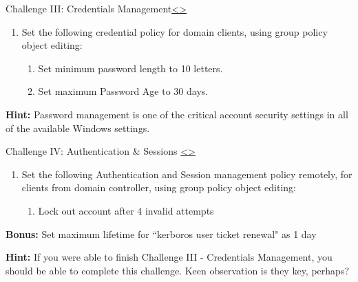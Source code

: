 \documentclass[12pt]{extarticle}
\newenvironment{instructionblock}{\Large\bgroup}{\egroup}
\begin{document}
\pagebreak
\begin{slide}{Challenge III: Credentials Management}{\hyperref[slide 20]{\textless}\hyperref[slide 22]{\textgreater}}
\begin{instructionblock}
\begin{enumerate}
	\item Set the following credential policy for domain clients, using group policy object editing:
\begin{enumerate}
 \item Set minimum password length to 10 letters.
 \item Set maximum Password Age to 30 days.
 \end{enumerate}
 \end{enumerate}

\end{instructionblock}
\end{slide}
\vspace{2mm}
\noindent
\textbf{Hint:} Password management is one of the critical account security settings in all of the available Windows settings.

\vfill




\pagebreak
\begin{slide}{Challenge IV: Authentication \& Sessions }{\hyperref[slide 21]{\textless}\hyperref[slide 23]{\textgreater}}
	\begin{instructionblock}
		\begin{enumerate}
			\item Set the following Authentication and Session management policy remotely, for clients from domain controller, using group policy object editing: 
		\begin{enumerate}
			\item Lock out account after 4 invalid attempts 
		\end{enumerate}
			
	\end{enumerate}
	\vspace{26mm}
	\noindent
	\textbf{Bonus:} Set maximum lifetime for ``kerboros user ticket renewal" as 1 day		
	\end{instructionblock}
\end{slide}

\vspace{2mm}
\noindent
\textbf{Hint:} If you were able to finish Challenge III - Credentials Management, you should be able to complete this challenge. Keen observation is they key, perhaps?
\end{document}
